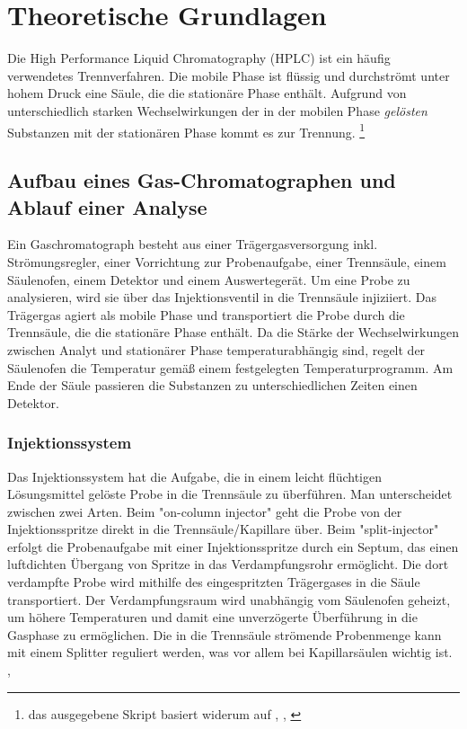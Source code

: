\section{Theoretische Grundlagen}
  
  Die High Performance Liquid Chromatography (HPLC) ist ein häufig verwendetes Trennverfahren. Die mobile Phase ist flüssig und durchströmt unter hohem Druck eine Säule, die die stationäre Phase enthält. Aufgrund von unterschiedlich starken Wechselwirkungen der in der mobilen Phase \textit{gelösten} Substanzen mit der stationären Phase kommt es zur Trennung. \citep{SkriptHPLC}\footnote{das ausgegebene Skript basiert widerum auf \citep{QuantitativeAnalyseHarris}, \citep{InstrumentelleAnalytikSkoog}, \citep{ModernLiquidChromatography}}
  
  \subsection{Aufbau eines Gas-Chromatographen und Ablauf einer Analyse}
    
    Ein Gaschromatograph besteht aus einer Trägergasversorgung inkl. Strömungsregler,  einer Vorrichtung zur Probenaufgabe, einer Trennsäule, einem Säulenofen, einem Detektor und einem Auswertegerät. Um eine Probe zu analysieren, wird sie über das Injektionsventil in die Trennsäule injiziiert. Das Trägergas agiert als mobile Phase und transportiert die Probe durch die Trennsäule, die die stationäre Phase enthält. Da die Stärke der Wechselwirkungen zwischen Analyt und stationärer Phase temperaturabhängig sind, regelt der Säulenofen die Temperatur gemäß einem festgelegten Temperaturprogramm. Am Ende der Säule passieren die Substanzen zu unterschiedlichen Zeiten einen Detektor. \citep[S. 164, 165]{Taschenatlas}
    
    \subsubsection{Injektionssystem}
      
      Das Injektionssystem hat die Aufgabe, die in einem leicht flüchtigen Lösungsmittel gelöste Probe in die Trennsäule zu überführen. Man unterscheidet zwischen zwei Arten. Beim "on-column injector" geht die Probe von der Injektionsspritze direkt in die Trennsäule/Kapillare über. Beim "split-injector" erfolgt die Probenaufgabe mit einer Injektionsspritze durch ein Septum, das einen luftdichten Übergang von Spritze in das Verdampfungsrohr ermöglicht. Die dort verdampfte Probe wird mithilfe des eingespritzten Trägergases in die Säule transportiert. Der Verdampfungsraum wird unabhängig vom Säulenofen geheizt, um höhere Temperaturen und damit eine unverzögerte Überführung in die Gasphase zu ermöglichen. Die in die Trennsäule strömende Probenmenge kann mit einem Splitter reguliert werden, was vor allem bei Kapillarsäulen wichtig ist. \citep{Versuchsvorschrift}, \citep[S. 164]{Taschenatlas}          
      
